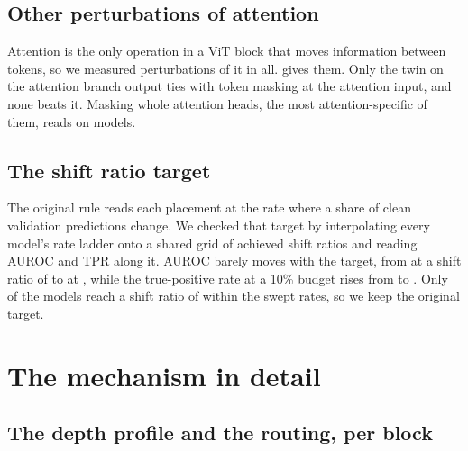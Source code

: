 
\FloatBarrier


\subsection{Other perturbations of attention}
\label{app:attention}

Attention is the only operation in a ViT block that moves information between tokens, so we measured \AttentionProbesTotal{} perturbations of it in all.  gives them. Only the twin on the attention branch output ties with token masking at the attention input, and none beats it. Masking whole attention heads, the most attention-specific of them, reads \AttentionHeadMaskAuroc{} on \AttentionHeadMaskN{} models.


\FloatBarrier


\subsection{The shift ratio target}
\label{app:rate}

The original rule reads each placement at the rate where a share \AdaptiveShiftTarget{} of clean validation predictions change. We checked that target by interpolating every model's rate ladder onto a shared grid of achieved shift ratios and reading AUROC and TPR along it. AUROC barely moves with the target, from \LadderAurocAtZeroSix{} at a shift ratio of \PlacementMatchTarget{} to \LadderAurocAtZeroEight{} at \AdaptiveShiftTarget{}, while the true-positive rate at a 10\% budget rises from \LadderTprOneZeroAtZeroSix{} to \LadderTprOneZeroAtZeroEight{}. Only \LadderAurocAtZeroNineN{} of the \LadderAurocAtZeroEightN{} models reach a shift ratio of \LadderStretchTarget{} within the swept rates, so we keep the original target.


\FloatBarrier
\clearpage

\section{The mechanism in detail}
\label{app:mechanism-group}

\subsection{The depth profile and the routing, per block}
\label{app:mechanism}



